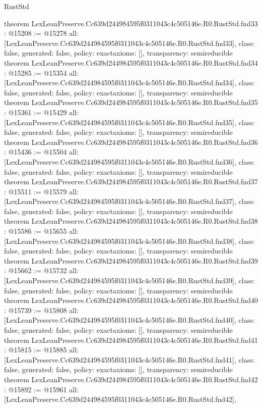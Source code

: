\begin{lexlean}{RustStd}
\begin{coremodule}
{}
theorem LexLeanPreserve.Cc639d244984595f0311043c4c505146e.R0.RustStd.fnd33 : @15208 := @15278 {
  all: [LexLeanPreserve.Cc639d244984595f0311043c4c505146e.R0.RustStd.fnd33],
  class: false,
  generated: false,
  policy: exact{axioms: []},
  transparency: semireducible
}
theorem LexLeanPreserve.Cc639d244984595f0311043c4c505146e.R0.RustStd.fnd34 : @15285 := @15354 {
  all: [LexLeanPreserve.Cc639d244984595f0311043c4c505146e.R0.RustStd.fnd34],
  class: false,
  generated: false,
  policy: exact{axioms: []},
  transparency: semireducible
}
theorem LexLeanPreserve.Cc639d244984595f0311043c4c505146e.R0.RustStd.fnd35 : @15361 := @15429 {
  all: [LexLeanPreserve.Cc639d244984595f0311043c4c505146e.R0.RustStd.fnd35],
  class: false,
  generated: false,
  policy: exact{axioms: []},
  transparency: semireducible
}
theorem LexLeanPreserve.Cc639d244984595f0311043c4c505146e.R0.RustStd.fnd36 : @15436 := @15504 {
  all: [LexLeanPreserve.Cc639d244984595f0311043c4c505146e.R0.RustStd.fnd36],
  class: false,
  generated: false,
  policy: exact{axioms: []},
  transparency: semireducible
}
theorem LexLeanPreserve.Cc639d244984595f0311043c4c505146e.R0.RustStd.fnd37 : @15511 := @15579 {
  all: [LexLeanPreserve.Cc639d244984595f0311043c4c505146e.R0.RustStd.fnd37],
  class: false,
  generated: false,
  policy: exact{axioms: []},
  transparency: semireducible
}
theorem LexLeanPreserve.Cc639d244984595f0311043c4c505146e.R0.RustStd.fnd38 : @15586 := @15655 {
  all: [LexLeanPreserve.Cc639d244984595f0311043c4c505146e.R0.RustStd.fnd38],
  class: false,
  generated: false,
  policy: exact{axioms: []},
  transparency: semireducible
}
theorem LexLeanPreserve.Cc639d244984595f0311043c4c505146e.R0.RustStd.fnd39 : @15662 := @15732 {
  all: [LexLeanPreserve.Cc639d244984595f0311043c4c505146e.R0.RustStd.fnd39],
  class: false,
  generated: false,
  policy: exact{axioms: []},
  transparency: semireducible
}
theorem LexLeanPreserve.Cc639d244984595f0311043c4c505146e.R0.RustStd.fnd40 : @15739 := @15808 {
  all: [LexLeanPreserve.Cc639d244984595f0311043c4c505146e.R0.RustStd.fnd40],
  class: false,
  generated: false,
  policy: exact{axioms: []},
  transparency: semireducible
}
theorem LexLeanPreserve.Cc639d244984595f0311043c4c505146e.R0.RustStd.fnd41 : @15815 := @15885 {
  all: [LexLeanPreserve.Cc639d244984595f0311043c4c505146e.R0.RustStd.fnd41],
  class: false,
  generated: false,
  policy: exact{axioms: []},
  transparency: semireducible
}
theorem LexLeanPreserve.Cc639d244984595f0311043c4c505146e.R0.RustStd.fnd42 : @15892 := @15961 {
  all: [LexLeanPreserve.Cc639d244984595f0311043c4c505146e.R0.RustStd.fnd42],
}
\end{coremodule}
\end{lexlean}
